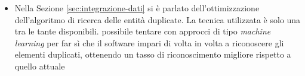 \begin{itemize}
	\item
	Nella Sezione \ref{sec:integrazione-dati} si è parlato dell'ottimizzazione dell'algoritmo di ricerca delle entità duplicate. La tecnica utilizzata è solo una tra le tante disponibili. \upe possibile tentare con approcci di tipo \emph{machine learning} per far sì che il software impari di volta in volta a riconoscere gli elementi duplicati, ottenendo un tasso di riconoscimento migliore rispetto a quello attuale
\end{itemize}